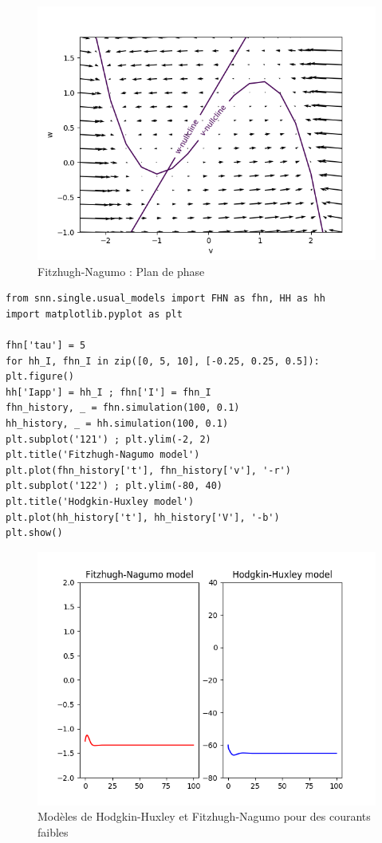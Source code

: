 \documentclass[12pt]{scrartcl}
\begin{document}
\begin{figure}[!h]
\centering
\includegraphics[scale=0.7]{imgs/FNPDP.png}
\caption{Fitzhugh-Nagumo : Plan de phase}
\label{FNPDP}
\end{figure}

\clearpage
\begin{lstlisting}[caption = {Comparaison des comportements des modèles de Fitzhugh-Nagumo et Hodgkin-Huxley}]
from snn.single.usual_models import FHN as fhn, HH as hh
import matplotlib.pyplot as plt

fhn['tau'] = 5
for hh_I, fhn_I in zip([0, 5, 10], [-0.25, 0.25, 0.5]):
plt.figure()
hh['Iapp'] = hh_I ; fhn['I'] = fhn_I
fhn_history, _ = fhn.simulation(100, 0.1)
hh_history, _ = hh.simulation(100, 0.1)
plt.subplot('121') ; plt.ylim(-2, 2) 
plt.title('Fitzhugh-Nagumo model')
plt.plot(fhn_history['t'], fhn_history['v'], '-r')
plt.subplot('122') ; plt.ylim(-80, 40) 
plt.title('Hodgkin-Huxley model')
plt.plot(hh_history['t'], hh_history['V'], '-b') 
plt.show()
\end{lstlisting}

\begin{figure}[!h]
\centering
\includegraphics[scale=0.5]{imgs/hhfhnfaible.png}
\caption{Modèles de Hodgkin-Huxley et Fitzhugh-Nagumo pour des courants faibles}
\label{hhfhnfaible}
\end{figure}
\end{document}
